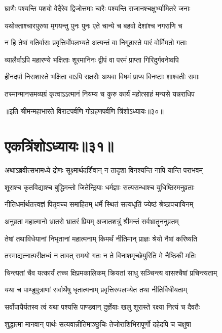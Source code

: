 \twolineshloka
{घ्राणैः पश्यन्ति पशवो वेदैरेव द्विजोत्तमाः}
{चारैः पश्यन्ति राजानश्चक्षुर्भ्यामितरे जनाः}


\twolineshloka
{यथोक्ताश्चारपुरुषा मृगयन्तु पुनः पुनः}
{एते चान्ये च बहवो देशांश्च नगराणि च}


\twolineshloka
{न हि तेषां गतिर्वासः प्रवृत्तिर्वोपलभ्यते}
{अत्यन्तं वा निगूढास्ते पारं वोर्मिमतो गताः}


\twolineshloka
{व्यालैर्वाऽपि महारण्ये भक्षिताः शूरमानिनः}
{द्वीपं वा परमं प्राप्ता गिरिदुर्गवनेष्वपि}


\twolineshloka
{हीनदर्पा निराशास्ते भक्षिता वाऽपि राक्षसैः}
{अथवा विषमं प्राप्य विनष्टाः शाश्वतीः समाः}


\twolineshloka
{तस्मान्मानसमव्यग्रं कृत्वाऽऽत्मानं नियम्य च}
{कुरु कार्यं महोत्साहं मन्यसे यन्नराधिप}

॥इति श्रीमन्महाभारते विराटपर्वणि गोग्रहणपर्वणि त्रिंशोऽध्यायः॥३०॥

\chapter{एकत्रिंशोऽध्यायः॥३१॥}

\twolineshloka
{अथाऽब्रवीत्सभामध्ये द्रोणः सूक्ष्मार्थदर्शिवान्}
{न तादृशा विनश्यन्ति नापि यान्ति पराभवम्}


\twolineshloka
{शूराश्च कृतविद्याश्च बुद्धिमन्तो जितेन्द्रियाः}
{धर्मज्ञाः सत्यसन्धाश्च युधिष्ठिरमनुव्रताः}


\twolineshloka
{नीतिधर्मार्थतत्त्वज्ञं पितृवच्च समाहितम्}
{धर्मे स्थितं सत्यधृतिं ज्येष्ठं श्रेष्ठापचायिनम्}


\twolineshloka
{अनुव्रता महात्मानो भ्रातरो भ्रातरं प्रियम्}
{अजातशत्रुं श्रीमन्तं सर्वभ्रातॄननुव्रतम्}


\twolineshloka
{तेषां तथाविधेयानां निभृतानां महात्मनाम्}
{किमर्थं नीतिमान् प्राज्ञः श्रेयो नैषां करिष्यति}


\twolineshloka
{तस्माद्यत्नात्परीक्षध्वं न तावत् समयो गतः}
{न ते विनाशमृच्छेयुरिति मे नैष्ठिकी मतिः}


\twolineshloka
{चिन्त्यतां चैव यत्कार्यं तच्च क्षिप्रमकालिकम्}
{क्रियतां साधु सञ्चिन्त्य वासश्चैषां प्रचिन्त्यताम्}


\twolineshloka
{यथा च पाण्डुपुत्राणां सर्वार्थेषु धृतात्मनाम्}
{प्रवृत्तिरुपलभ्येत तथा नीतिर्विधीयताम्}


\twolineshloka
{सर्वोपायैर्यतस्व त्वं यथा पश्यसि पाण्डवान्}
{दुर्ज्ञेयाः खलु शूरास्ते रक्ष्या नित्यं च दैवतैः}


\twolineshloka
{शुद्धात्मा मानवान् पार्थः सत्यवान्नीतिमाञ्छुचिः}
{तेजोराशिभिरापूर्णो दहेदपि च चक्षुषा}


